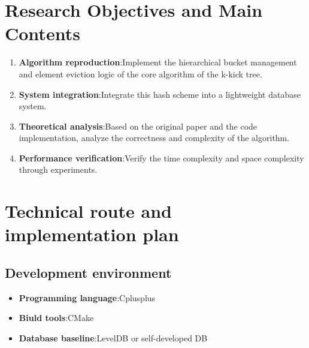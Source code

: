 \documentclass[a4paper,12pt]{ctexart}
\begin{document}
\section{Research Objectives and Main Contents}

\begin{enumerate}
    \item \textbf{Algorithm reproduction}:Implement the hierarchical bucket management and element eviction logic of the core algorithm of the k-kick tree.
    \item \textbf{System integration}:Integrate this hash scheme into a lightweight database system.
    \item \textbf{Theoretical analysis}:Based on the original paper and the code implementation, analyze the correctness and complexity of the algorithm.
    \item \textbf{Performance verification}:Verify the time complexity and space complexity through experiments.
\end{enumerate}


\section{Technical route and implementation plan}

\subsection{Development environment}
\begin{itemize}
    \item \textbf{Programming language}:Cplusplus
    \item \textbf{Biuld tools}:CMake
    \item \textbf{Database baseline}:LevelDB or self-developed DB
\end{itemize}
\end{document}
